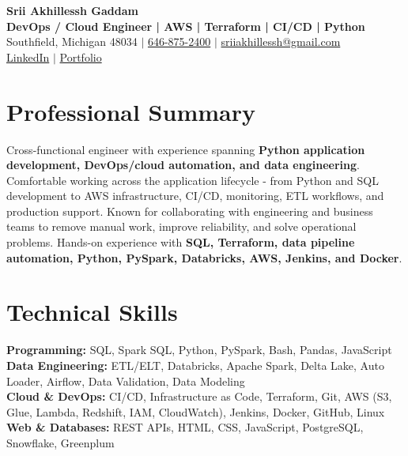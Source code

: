 \documentclass[letterpaper,10pt]{article}
\begin{document}
\fontsize{9.35pt}{10.45pt}\selectfont

\begin{center}
    {\LARGE \textbf{Srii Akhillessh Gaddam}} \\[-1pt]
    \textbf{DevOps / Cloud Engineer | AWS | Terraform | CI/CD | Python} \\[2pt]
    Southfield, Michigan 48034 $|$
    \href{tel:6468752400}{646-875-2400} $|$
    \href{mailto:sriiakhillessh@gmail.com}{sriiakhillessh@gmail.com} \\[1pt]
    \href{https://www.linkedin.com/in/srii-akhiilessh-gaddam-b48668191/}{LinkedIn} $|$
    \href{https://sriiakhillesshg.github.io/portfolio/}{Portfolio}
\end{center}
\vspace{-8pt}

\section{Professional Summary}
\small{Cross-functional engineer with experience spanning \textbf{Python application development, DevOps/cloud automation, and data engineering}. Comfortable working across the application lifecycle - from Python and SQL development to AWS infrastructure, CI/CD, monitoring, ETL workflows, and production support. Known for collaborating with engineering and business teams to remove manual work, improve reliability, and solve operational problems. Hands-on experience with \textbf{SQL, Terraform, data pipeline automation, Python, PySpark, Databricks, AWS, Jenkins, and Docker}.}

\section{Technical Skills}
\small{
\textbf{Programming:} SQL, Spark SQL, Python, PySpark, Bash, Pandas, JavaScript \\
\textbf{Data Engineering:} ETL/ELT, Databricks, Apache Spark, Delta Lake, Auto Loader, Airflow, Data Validation, Data Modeling \\
\textbf{Cloud \& DevOps:} CI/CD, Infrastructure as Code, Terraform, Git, AWS (S3, Glue, Lambda, Redshift, IAM, CloudWatch), Jenkins, Docker, GitHub, Linux \\
\textbf{Web \& Databases:} REST APIs, HTML, CSS, JavaScript, PostgreSQL, Snowflake, Greenplum
}
\end{document}

